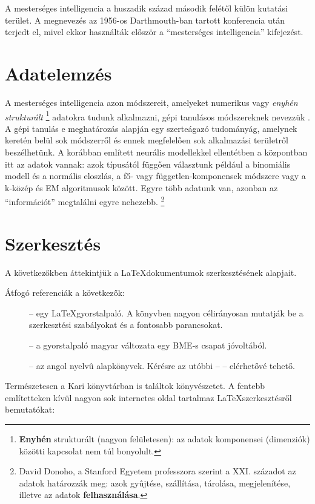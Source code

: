 A mesterséges intelligencia a huszadik század második felétől
külön kutatási terület. A megnevezés az 1956-os Darthmouth-ban
tartott konferencia után terjedt el, mivel ekkor használták
először a ``mesterséges intelligencia''
kifejezést.  


\section{Adatelemzés}\label{sec:ALAP:adatelem}

A mesterséges intelligencia azon módszereit, amelyeket numerikus
vagy {\em
  enyhén strukturált}%
\footnote{%
 {\bf Enyhén} strukturált (nagyon felületesen): az adatok komponensei
  (dimenziók) közötti kapcsolat nem túl bonyolult.
}  %
adatokra tudunk alkalmazni, gépi tanulásos módszereknek nevezzük
\cite{Mitchell97}.  A gépi tanulás e meghatározás alapján egy
szerteágazó tudományág, amelynek keretén belül sok módszerről és
ennek megfelelően sok alkalmazási területről beszélhetünk. A
korábban említett neurális modellekkel ellentétben a központban
itt az adatok vannak: azok típusától függően választunk például a
binomiális modell és a normális eloszlás, a fő- vagy
független-komponensek módszere vagy a k-közép és EM
algoritmusok között.
Egyre több adatunk van, azonban az ``információt'' megtalálni egyre nehezebb.%
\footnote{%
    David Donoho, a Stanford Egyetem professzora szerint a XXI. századot az adatok határozzák meg: azok gyûjtése, szállítása, tárolása, megjelenítése, illetve az adatok {\bf felhasználása}.
}  %


\section{Szerkesztés}\label{sec:ALAP:szerkeszt}

A következőkben áttekintjük a \LaTeX dokumentumok szerkesztésének alapjait.

Átfogó referenciák a következők:
\begin{description}%
	\item[\cite{LatexNotSoShort}] -- egy \LaTeX gyorstalpaló. A könyvben nagyon
	  célirányosan mutatják be a szerkesztési szabályokat és a fontosabb parancsokat.
	\item[\cite{LatexNotSoShortHU}] -- a gyorstalpaló magyar változata egy BME-s
	  csapat jóvoltából.
	\item[\cite{Doob95,MittelbachEtAl04}] -- az angol nyelvû alapkönyvek. Kérésre az
	  utóbbi -- \cite{MittelbachEtAl04} -- elérhetővé tehető.
\end{description}
Természetesen a Kari könyvtárban is találtok könyvészetet. A fentebb említetteken kívül nagyon sok internetes oldal tartalmaz \LaTeX szerkesztésről bemutatókat:


